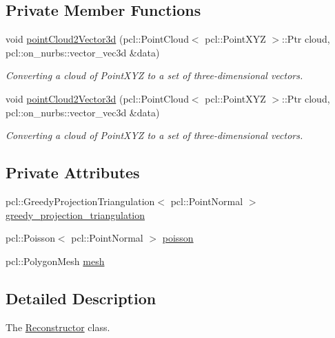 \subsection*{Private Member Functions}
\begin{DoxyCompactItemize}
\item 
void \hyperlink{classhull__abstraction_1_1_reconstructor_a484b377810bba7e42d39c47ed3725941}{point\+Cloud2\+Vector3d} (pcl\+::\+Point\+Cloud$<$ pcl\+::\+Point\+X\+YZ $>$\+::Ptr cloud, pcl\+::on\+\_\+nurbs\+::vector\+\_\+vec3d \&data)
\begin{DoxyCompactList}\small\item\em Converting a cloud of Point\+X\+YZ to a set of three-\/dimensional vectors. \end{DoxyCompactList}\item 
void \hyperlink{classhull__abstraction_1_1_reconstructor_a484b377810bba7e42d39c47ed3725941}{point\+Cloud2\+Vector3d} (pcl\+::\+Point\+Cloud$<$ pcl\+::\+Point\+X\+YZ $>$\+::Ptr cloud, pcl\+::on\+\_\+nurbs\+::vector\+\_\+vec3d \&data)
\begin{DoxyCompactList}\small\item\em Converting a cloud of Point\+X\+YZ to a set of three-\/dimensional vectors. \end{DoxyCompactList}\end{DoxyCompactItemize}
\subsection*{Private Attributes}
\begin{DoxyCompactItemize}
\item 
pcl\+::\+Greedy\+Projection\+Triangulation$<$ pcl\+::\+Point\+Normal $>$ \hyperlink{classhull__abstraction_1_1_reconstructor_aeb53b00a5a6300f6fcbef59d6759f01b}{greedy\+\_\+projection\+\_\+triangulation}
\item 
pcl\+::\+Poisson$<$ pcl\+::\+Point\+Normal $>$ \hyperlink{classhull__abstraction_1_1_reconstructor_a60dfa765833af8d05f1426be0e96adb0}{poisson}
\item 
pcl\+::\+Polygon\+Mesh \hyperlink{classhull__abstraction_1_1_reconstructor_af0818936b15dd13f3a9fa3e70734cd57}{mesh}
\end{DoxyCompactItemize}


\subsection{Detailed Description}
The \hyperlink{classhull__abstraction_1_1_reconstructor}{Reconstructor} class. 

